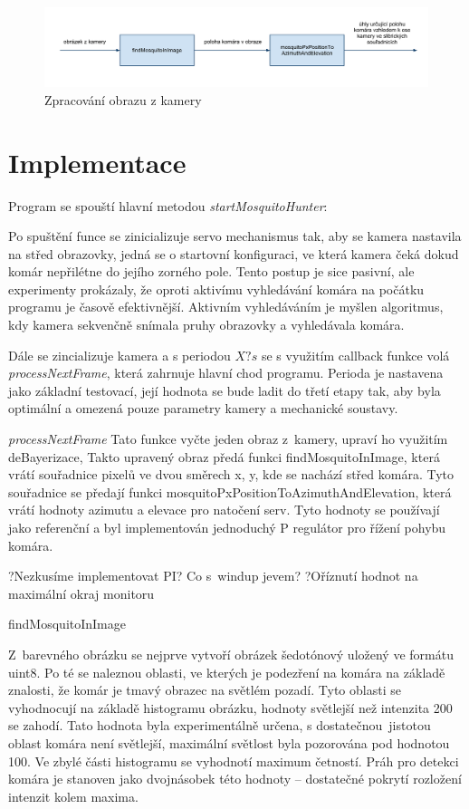 \documentclass[a4paper,10pt]{article}
\begin{document}
\begin{figure}[!htb]
    \centering
     \includegraphics[width=1\columnwidth]{pics/zpracovani_obrazu_z_kamery}
     \caption{Zpracování obrazu z kamery\label{fig:rid_system}}
\end{figure}

\section{Implementace}

Program se spouští hlavní metodou \textit{startMosquitoHunter}:

Po spuštění funce se zinicializuje servo mechanismus tak, aby se kamera nastavila na střed obrazovky, jedná se o startovní konfiguraci, ve která kamera čeká dokud komár nepřilétne do jejího zorného pole. Tento postup je sice pasivní, ale experimenty prokázaly, že oproti aktivímu vyhledávání komára na počátku programu je časově efektivnější. Aktivním vyhledáváním je myšlen algoritmus, kdy kamera sekvenčně snímala pruhy obrazovky a vyhledávala komára.

Dále se zincializuje kamera a s periodou $X? s$ se s využitím callback funkce volá \textit{processNextFrame}, která zahrnuje hlavní chod programu. Perioda je nastavena jako základní testovací, její hodnota se bude ladit do třetí etapy tak, aby byla optimální a omezená pouze parametry kamery a mechanické soustavy. 

\textit{processNextFrame}
Tato funkce vyčte jeden obraz z~kamery, upraví ho využitím deBayerizace, Takto upravený obraz předá funkci findMosquitoInImage, která vrátí souřadnice pixelů ve dvou směrech x, y, kde se nachází střed komára. Tyto souřadnice se předají funkci mosquitoPxPositionToAzimuthAndElevation, která vrátí hodnoty azimutu a elevace pro natočení serv. Tyto hodnoty se používají jako referenční a byl implementován jednoduchý P regulátor pro řížení pohybu komára.

?Nezkusíme implementovat PI? Co s~windup jevem?
?Oříznutí hodnot na maximální okraj monitoru

findMosquitoInImage

Z~barevného obrázku se nejprve vytvoří obrázek šedotónový uložený ve formátu uint8. Po té se naleznou oblasti, ve kterých je podezření na komára na základě znalosti, že komár je tmavý obrazec na světlém pozadí. Tyto oblasti se vyhodnocují na základě histogramu obrázku, hodnoty světlejší než intenzita 200 se zahodí. Tato hodnota byla experimentálně určena, s dostatečnou~jistotou oblast komára není světlejší, maximální světlost byla pozorována pod hodnotou 100. Ve zbylé části histogramu se vyhodnotí maximum četností. Práh pro detekci komára je stanoven jako dvojnásobek této hodnoty – dostatečné pokrytí rozložení intenzit kolem maxima. 
\end{document}
